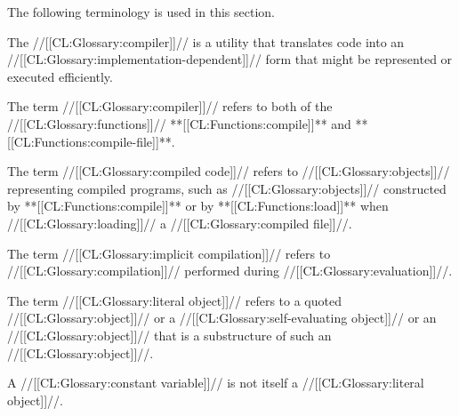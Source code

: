 























\def\sim#1#2#3{{\cal S}\sub{#1}(#2,#3)}








 
The following terminology is used in this section.
 

The //[[CL:Glossary:compiler]]// is a utility that translates code into an
//[[CL:Glossary:implementation-dependent]]// form that might be represented or
executed efficiently.

The term //[[CL:Glossary:compiler]]// refers to both of the //[[CL:Glossary:functions]]//
**[[CL:Functions:compile]]** and **[[CL:Functions:compile-file]]**.



The term //[[CL:Glossary:compiled code]]// refers to 
//[[CL:Glossary:objects]]// representing compiled programs, such as //[[CL:Glossary:objects]]// constructed
by **[[CL:Functions:compile]]** or by **[[CL:Functions:load]]** when //[[CL:Glossary:loading]]// a //[[CL:Glossary:compiled file]]//.


The term //[[CL:Glossary:implicit compilation]]// refers to //[[CL:Glossary:compilation]]//
performed during //[[CL:Glossary:evaluation]]//.



The term //[[CL:Glossary:literal object]]// refers to 
     a quoted //[[CL:Glossary:object]]// 
  or a //[[CL:Glossary:self-evaluating object]]// 
  or an //[[CL:Glossary:object]]// that is a substructure of such an //[[CL:Glossary:object]]//.

A //[[CL:Glossary:constant variable]]// is not itself a //[[CL:Glossary:literal object]]//.










